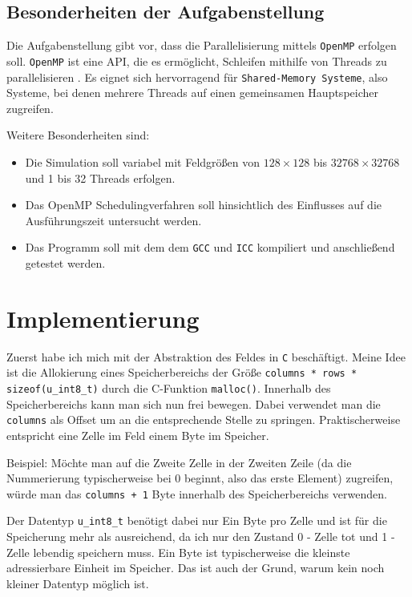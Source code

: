 \documentclass[german,plainarticle,hyperref,utf8]{zihpub}
\begin{document}
	\subsection{Besonderheiten der Aufgabenstellung}
	Die Aufgabenstellung gibt vor, dass die Parallelisierung mittels \texttt{OpenMP} erfolgen soll. \texttt{OpenMP} ist eine API, die es ermöglicht, Schleifen mithilfe von Threads zu parallelisieren \cite{openmp}. Es eignet sich hervorragend für \texttt{Shared-Memory Systeme}, also Systeme, bei denen mehrere Threads auf einen gemeinsamen Hauptspeicher zugreifen.
	
	Weitere Besonderheiten sind:
	\begin{itemize}
		\item Die Simulation soll variabel mit Feldgrößen von $128\times 128$ bis $32768\times 32768$ und 1 bis 32 Threads erfolgen.
		\item Das OpenMP Schedulingverfahren soll hinsichtlich des Einflusses auf die Ausführungszeit untersucht werden.
		\item Das Programm soll mit dem dem \texttt{GCC} und \texttt{ICC} kompiliert und anschließend getestet werden.
	\end{itemize}
	
	\section{Implementierung}
	Zuerst habe ich mich mit der Abstraktion des Feldes in \texttt{C} beschäftigt. Meine Idee ist die Allokierung eines Speicherbereichs der Größe \texttt{columns * rows * sizeof(u\_int8\_t)} durch die C-Funktion \texttt{malloc()}. Innerhalb des Speicherbereichs kann man sich nun frei bewegen. Dabei verwendet man die \texttt{columns} als Offset um an die entsprechende Stelle zu springen. Praktischerweise entspricht eine Zelle im Feld einem Byte im Speicher.
	
	Beispiel: Möchte man auf die Zweite Zelle in der Zweiten Zeile (da die Nummerierung typischerweise bei 0 beginnt, also das erste Element) zugreifen, würde man das \texttt{columns + 1} Byte innerhalb des Speicherbereichs verwenden.
	
	Der Datentyp \texttt{u\_int8\_t} benötigt dabei nur Ein Byte pro Zelle und ist für die Speicherung mehr als ausreichend, da ich nur den Zustand 0 - Zelle tot und 1 - Zelle lebendig speichern muss. Ein Byte ist typischerweise die kleinste adressierbare Einheit im Speicher. Das ist auch der Grund, warum kein noch kleiner Datentyp möglich ist.\\
	
\end{document}
